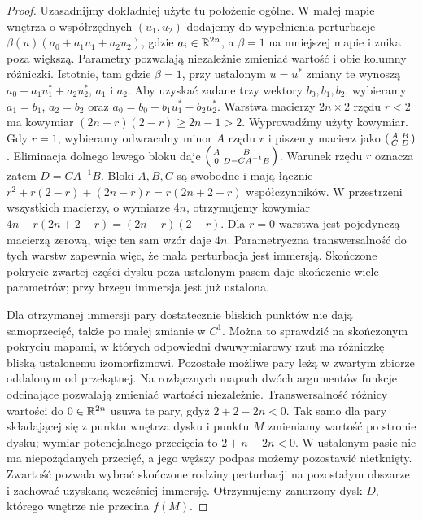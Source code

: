 \begin{proof}
Uzasadnijmy dokładniej użyte tu położenie ogólne.
W małej mapie wnętrza o współrzędnych $(u_1,u_2)$
dodajemy do wypełnienia perturbacje
$\beta(u)(a_0+a_1u_1+a_2u_2)$, gdzie $a_i\in\mathbb{R}^{2n}$,
a $\beta=1$ na mniejszej mapie i znika poza większą.
Parametry pozwalają niezależnie zmieniać wartość
i obie kolumny różniczki.
Istotnie, tam gdzie $\beta=1$, przy ustalonym $u=u^*$
zmiany te wynoszą
$a_0+a_1u_1^*+a_2u_2^*$, $a_1$ i $a_2$.
Aby uzyskać zadane trzy wektory $b_0,b_1,b_2$,
wybieramy $a_1=b_1$, $a_2=b_2$ oraz
$a_0=b_0-b_1u_1^*-b_2u_2^*$.
Warstwa macierzy
$2n\times2$ rzędu $r<2$ ma kowymiar
$(2n-r)(2-r)\geq2n-1>2$.
Wyprowadźmy użyty kowymiar. Gdy $r=1$,
wybieramy odwracalny minor $A$ rzędu $r$
i piszemy macierz jako
$\begin{psmallmatrix}A&B\\ C&D\end{psmallmatrix}$.
Eliminacja dolnego lewego bloku daje
$\begin{psmallmatrix}A&B\\0&D-CA^{-1}B\end{psmallmatrix}$.
Warunek rzędu $r$ oznacza zatem $D=CA^{-1}B$.
Bloki $A,B,C$ są swobodne i mają łącznie
$r^2+r(2-r)+(2n-r)r=r(2n+2-r)$ współczynników.
W przestrzeni wszystkich macierzy, o wymiarze $4n$,
otrzymujemy kowymiar
$4n-r(2n+2-r)=(2n-r)(2-r)$.
Dla $r=0$ warstwa jest pojedynczą macierzą zerową,
więc ten sam wzór daje $4n$.
Parametryczna transwersalność
do tych warstw zapewnia więc, że mała perturbacja
jest immersją. Skończone pokrycie zwartej części
dysku poza ustalonym pasem daje skończenie wiele
parametrów; przy brzegu immersja jest już ustalona.

Dla otrzymanej immersji pary dostatecznie bliskich
punktów nie dają samoprzecięć, także po małej zmianie
w $C^1$. Można to sprawdzić na skończonym pokryciu
mapami, w których odpowiedni dwuwymiarowy rzut ma
różniczkę bliską ustalonemu izomorfizmowi.
Pozostałe możliwe pary leżą w zwartym zbiorze
oddalonym od przekątnej. Na rozłącznych mapach
dwóch argumentów funkcje odcinające pozwalają
zmieniać wartości niezależnie. Transwersalność
różnicy wartości do $0\in\mathbb{R}^{2n}$ usuwa te pary,
gdyż $2+2-2n<0$. Tak samo dla pary składającej się
z punktu wnętrza dysku i punktu $M$ zmieniamy
wartość po stronie dysku; wymiar potencjalnego
przecięcia to $2+n-2n<0$. W ustalonym pasie nie
ma niepożądanych przecięć, a jego węższy podpas
możemy pozostawić nietknięty. Zwartość pozwala
wybrać skończone rodziny perturbacji na pozostałym
obszarze i zachować uzyskaną wcześniej immersję.
Otrzymujemy zanurzony dysk $D$, którego wnętrze
nie przecina $f(M)$.


\end{proof}

